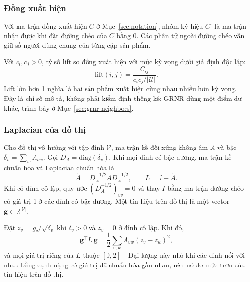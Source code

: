 \subsubsection{Đồng xuất hiện}
\label{sec:cooccurrence}

\begin{dn}
\label{def:cooccurrence}
Với ma trận đồng xuất hiện $C$ ở Mục~\ref{sec:notation}, nhóm ký hiệu $C^\circ$ là ma trận nhận được khi đặt đường chéo của $C$ bằng 0. Các phần tử ngoài đường chéo vẫn giữ số người dùng chung của từng cặp sản phẩm.
\end{dn}

Với $c_i,c_j>0$, tỷ số lift so đồng xuất hiện với mức kỳ vọng dưới giả định độc lập:
\begin{equation}
\mathrm{lift}(i,j)=\frac{C_{ij}}{c_i c_j/|\mathcal{U}|} .
\end{equation}
Lift lớn hơn 1 nghĩa là hai sản phẩm xuất hiện cùng nhau nhiều hơn kỳ vọng. Đây là chỉ số mô tả, không phải kiểm định thống kê; GRNR dùng một điểm dư khác, trình bày ở Mục~\ref{sec:grnr-neighbors}.

\subsubsection{Laplacian của đồ thị}
\label{sec:graph-filters}

\begin{dn}
\label{def:laplacian}
Cho đồ thị vô hướng với tập đỉnh $\mathcal{V}$, ma trận kề đối xứng không âm $A$ và bậc $\delta_v=\sum_w A_{vw}$. Gọi $D_A=\mathrm{diag}(\delta_v)$. Khi mọi đỉnh có bậc dương, ma trận kề chuẩn hóa và Laplacian chuẩn hóa là
\begin{equation}
\tilde A = D_A^{-1/2}AD_A^{-1/2}, \qquad L = I-\tilde A .
\label{eq:laplacian}
\end{equation}
Khi có đỉnh cô lập, quy ước $(D_A^{-1/2})_{vv}=0$ và thay $I$ bằng ma trận đường chéo có giá trị 1 ở các đỉnh có bậc dương. Một tín hiệu trên đồ thị là một vector $\mathbf g\in\mathbb{R}^{|\mathcal{V}|}$.
\end{dn}

Đặt $z_v=g_v/\sqrt{\delta_v}$ khi $\delta_v>0$ và $z_v=0$ ở đỉnh cô lập. Khi đó,
\begin{equation}
\mathbf g^\top L\,\mathbf g=\frac12\sum_{v,w}A_{vw}(z_v-z_w)^2 ,
\label{eq:laplacian-quadratic}
\end{equation}
và mọi giá trị riêng của $L$ thuộc $[0,2]$~\cite[Mục~1.2--1.4]{chung1997spectral}. Đại lượng này nhỏ khi các đỉnh nối với nhau bằng cạnh nặng có giá trị đã chuẩn hóa gần nhau, nên nó đo mức trơn của tín hiệu trên đồ thị.

